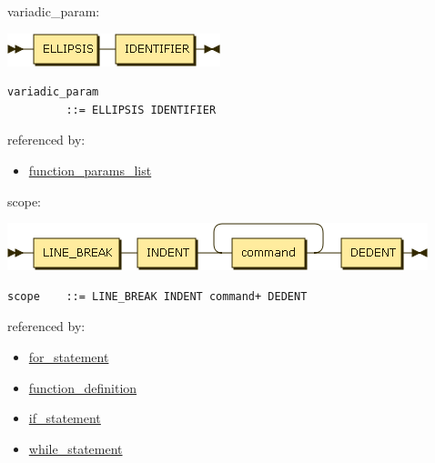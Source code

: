 \begin{minipage}{\textwidth}
\protect\hypertarget{variadic_param}{}{variadic\_param:}

\includegraphics[width=2.43750in,height=0.37500in]{diagram/variadic_param.png}

\begin{verbatim}
variadic_param
         ::= ELLIPSIS IDENTIFIER
\end{verbatim}

referenced by:

\begin{itemize}
\tightlist
\item
  \protect\hyperlink{function_params_list}{function\_params\_list}
\end{itemize}

\end{minipage}

\begin{minipage}{\textwidth}
\protect\hypertarget{scope}{}{scope:}

\includegraphics[width=4.81250in,height=0.54167in]{diagram/scope.png}

\begin{verbatim}
scope    ::= LINE_BREAK INDENT command+ DEDENT
\end{verbatim}

referenced by:

\begin{itemize}
\tightlist
\item
  \protect\hyperlink{for_statement}{for\_statement}
\item
  \protect\hyperlink{function_definition}{function\_definition}
\item
  \protect\hyperlink{if_statement}{if\_statement}
\item
  \protect\hyperlink{while_statement}{while\_statement}
\end{itemize}

\end{minipage}

